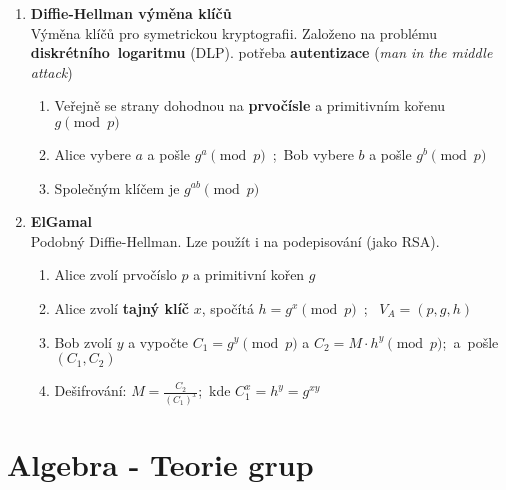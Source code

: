 \documentclass[12pt,a4paper]{article}
\begin{document}
\begin{enumerate}[leftmargin=*]
\begin{enumerate}
			
			\item \textbf{Diffie-Hellman výměna klíčů}\\
			Výměna klíčů pro symetrickou kryptografii. Založeno na problému \textbf{diskrétního~logaritmu} (DLP). potřeba \textbf{autentizace} (\textit{man in the middle attack})
			\begin{enumerate}
				\item Veřejně se strany dohodnou na \textbf{prvočísle} a primitivním kořenu $g \pmod{p}$
				\item Alice vybere $a$ a pošle $g^a \pmod{p}$~;~Bob vybere $b$ a pošle $g^b \pmod{p}$
				\item Společným klíčem je $g^{ab} \pmod{p}$
			\end{enumerate}
			
			
			\item \textbf{ElGamal}\\
			Podobný Diffie-Hellman. Lze použít i na podepisování (jako RSA).
			\begin{enumerate}
				\item Alice zvolí prvočíslo $p$ a primitivní kořen $g$
				\item Alice zvolí \textbf{tajný klíč} $x$, spočítá $h=g^x \pmod{p}$~;~ $V_A = (p,g,h)$
				\item Bob zvolí $y$ a vypočte $C_1 = g^y \pmod{p}$ a $C_2 = M \cdot h^y \pmod{p}$;~a~pošle $ (C_1,C_2)$
				\item Dešifrování: $M =\frac{C_2}{(C_1)^x}$;~kde $C_1^x = h^y =g^{xy}$
			\end{enumerate}
		\end{enumerate}
		
	\end{enumerate}
	
	\pagebreak
	\section{Algebra - Teorie grup}
	
\end{document}
